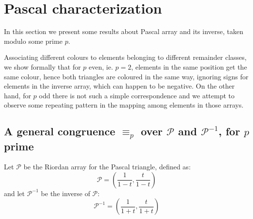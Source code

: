 
\section{Pascal characterization}

In this section we present some results about Pascal array and
its inverse, taken modulo some prime $p$. 

Associating different colours to elements belonging to different remainder
classes, we show formally that for $p$ even, ie. $p=2$, elements in the same
position get the same colour, hence both triangles are coloured in the same
way, ignoring signs for elements in the inverse array, which can happen to be
negative. On the other hand, for $p$ odd there is not such a simple
correspondence and we attempt to observe some repeating pattern in the mapping
among elements in those arrays.

\subsection{A general congruence $\equiv_{p}$ over $\mathcal{P}$ and $\mathcal{P}^{-1}$,
    for $p$ prime}

Let $\mathcal{P}$ be the Riordan array for the Pascal triangle,
defined as:
\begin{displaymath} 
    \mathcal{P} = \left(\frac{1}{1-t}, \frac{t}{1-t}  \right)
\end{displaymath} 
and let $\mathcal{P}^{-1}$ be the inverse of $\mathcal{P}$:
\begin{displaymath} 
    \mathcal{P}^{-1} = \left(\frac{1}{1+t}, \frac{t}{1+t}  \right)
\end{displaymath} 

